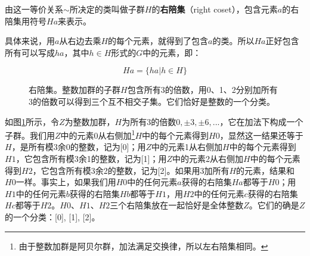 \documentclass{article}
\begin{document}
\begin{definition}
由这一等价关系$\sim$所决定的类叫做子群$H$的\textbf{右陪集}（right coset），包含元素$a$的右陪集用符号$Ha$来表示。
\end{definition}

具体来说，用$a$从右边去乘$H$的每个元素，就得到了包含$a$的类。所以$Ha$正好包含所有可以写成$ha$，其中$h \in H$形式的$G$中的元素，即：

\[
Ha = \{ha | h \in H\}
\]

\begin{figure}[htbp]
\centering
{}
\caption{右陪集。整数加群的子群$H$包含所有3的倍数，用0、1、2分别加所有3的倍数可以得到三个互不相交子集。它们恰好是整数的一个分类。}
\label{fig:right-cosets-Z3}
\end{figure}

如图\ref{fig:right-cosets-Z3}所示，令$Z$为整数加群，$H$为所有3的倍数$0, \pm 3, \pm 6, ...$，它在加法下构成一个子群。我们用$Z$中的元素0从右侧加\footnote{由于整数加群是阿贝尔群，加法满足交换律，所以左右陪集相同。}$H$中的每个元素得到$H0$，显然这一结果还等于$H$，是所有模3余0的整数，记为[0]；用$Z$中的元素1从右侧加$H$中的每个元素得到$H1$，它包含所有模3余1的整数，记为[1]；用$Z$中的元素2从右侧加$H$中的每个元素得到$H2$，它包含所有模3余2的整数，记为[2]。如果用3加所有$H$的元素，结果和$H0$一样。事实上，如果我们用$H0$中的任何元素$a$获得的右陪集$Ha$都等于$H0$；用$H1$中的任何元素$b$获得的右陪集$Hb$都等于$H1$，用$H2$中的任何元素$c$获得的右陪集$Hc$都等于$H2$。$H0$、$H1$、$H2$三个右陪集放在一起恰好是全体整数$Z$。它们的确是$Z$的一个分类：[0], [1], [2]。
\end{document}
